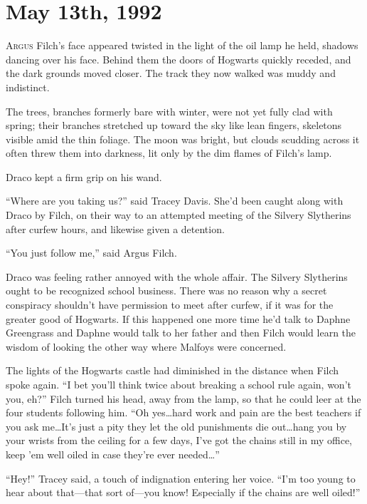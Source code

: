 
\section{May 13th, 1992}

\lettrine{A}{rgus} Filch’s face appeared twisted in the light of the oil lamp he held, shadows dancing over his face. Behind them the doors of Hogwarts quickly receded, and the dark grounds moved closer. The track they now walked was muddy and indistinct.

The trees, branches formerly bare with winter, were not yet fully clad with spring; their branches stretched up toward the sky like lean fingers, skeletons visible amid the thin foliage. The moon was bright, but clouds scudding across it often threw them into darkness, lit only by the dim flames of Filch’s lamp.

Draco kept a firm grip on his wand.

“Where are you taking us?” said Tracey Davis. She’d been caught along with Draco by Filch, on their way to an attempted meeting of the Silvery Slytherins after curfew hours, and likewise given a detention.

“You just follow me,” said Argus Filch.

Draco was feeling rather annoyed with the whole affair. The Silvery Slytherins ought to be recognized school business. There was no reason why a secret conspiracy shouldn’t have permission to meet after curfew, if it was for the greater good of Hogwarts. If this happened one more time he’d talk to Daphne Greengrass and Daphne would talk to her father and then Filch would learn the wisdom of looking the other way where Malfoys were concerned.

The lights of the Hogwarts castle had diminished in the distance when Filch spoke again. “I bet you’ll think twice about breaking a school rule again, won’t you, eh?” Filch turned his head, away from the lamp, so that he could leer at the four students following him. “Oh yes…hard work and pain are the best teachers if you ask me…It’s just a pity they let the old punishments die out…hang you by your wrists from the ceiling for a few days, I’ve got the chains still in my office, keep ’em well oiled in case they’re ever needed…”

“Hey!” Tracey said, a touch of indignation entering her voice. “I’m too young to hear about that—that sort of—you know! Especially if the chains are well oiled!”

